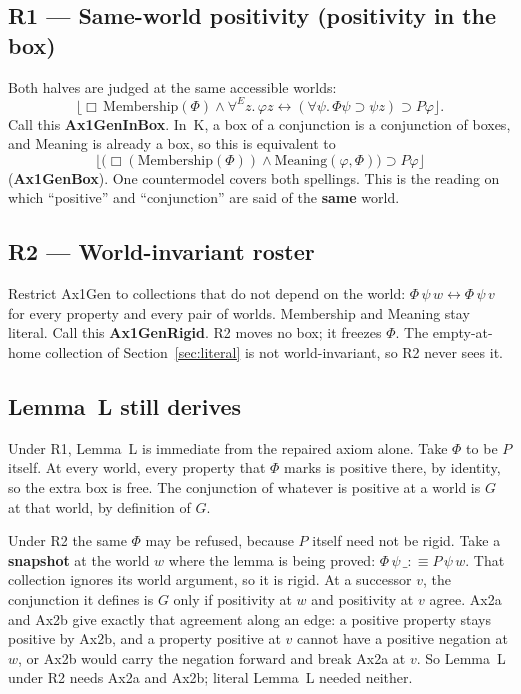 \documentclass[11pt]{article}
\newcommand{\floor}[1]{\lfloor #1 \rfloor}
\newcommand{\Membership}{\mathrm{Membership}}
\newcommand{\Meaning}{\mathrm{Meaning}}
\begin{document}
\subsection*{R1 --- Same-world positivity (positivity in the box)}

Both halves are judged at the same accessible worlds:
\[
\floor{\Box\,\Membership(\Phi) \land \forall^E z.\, \varphi z \leftrightarrow (\forall\psi.\, \Phi\psi \supset \psi z) \supset P\varphi}.
\]
Call this \textbf{Ax1GenInBox}. In~K, a box of a conjunction is a conjunction of boxes, and
Meaning is already a box, so this is equivalent to
\[
\floor{\bigl(\Box(\Membership(\Phi)) \land \Meaning(\varphi,\Phi)\bigr) \supset P\varphi}
\]
(\textbf{Ax1GenBox}). One countermodel covers both spellings. This is the reading on which
``positive'' and ``conjunction'' are said of the \textbf{same} world.

\subsection*{R2 --- World-invariant roster}

Restrict Ax1Gen to collections that do not depend on the world:
\(\Phi\,\psi\,w \leftrightarrow \Phi\,\psi\,v\) for every property and every pair of worlds.
Membership and Meaning stay literal. Call this \textbf{Ax1GenRigid}. R2 moves no box; it
freezes \(\Phi\). The empty-at-home collection of Section~\ref{sec:literal} is not
world-invariant, so R2 never sees it.

\subsection{Lemma~L still derives}

Under R1, Lemma~L is immediate from the repaired axiom alone. Take \(\Phi\) to be \(P\)
itself. At every world, every property that \(\Phi\) marks is positive there, by identity,
so the extra box is free. The conjunction of whatever is positive at a world is \(G\) at
that world, by definition of \(G\).

Under R2 the same \(\Phi\) may be refused, because \(P\) itself need not be rigid. Take a
\textbf{snapshot} at the world \(w\) where the lemma is being proved:
\(\Phi\,\psi\,\_ :\equiv P\,\psi\,w\). That collection ignores its world argument, so it is
rigid. At a successor \(v\), the conjunction it defines is \(G\) only if positivity at \(w\)
and positivity at \(v\) agree. Ax2a and Ax2b give exactly that agreement along an edge: a
positive property stays positive by Ax2b, and a property positive at \(v\) cannot have a
positive negation at \(w\), or Ax2b would carry the negation forward and break Ax2a at \(v\).
So Lemma~L under R2 needs Ax2a and Ax2b; literal Lemma~L needed neither.
\end{document}
